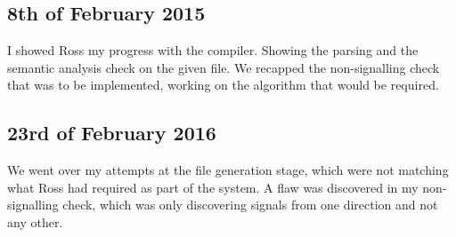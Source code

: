 \documentclass[report.tex]{subfiles}
\begin{document}
\subsection{8th of February 2015} %
\label{sub:8th_of_february_2015}
I showed Ross my progress with the compiler. Showing the parsing and the
semantic analysis check on the given file. We recapped the non-signalling check
that was to be implemented, working on the algorithm that would be required.

\subsection{23rd of February 2016} %
\label{sub:23rd_of_february_2016}
We went over my attempts at the file generation stage, which were not matching
what Ross had required as part of the system. A flaw was discovered in my 
non-signalling check, which was only discovering signals from one direction and
not any other.
\end{document}
